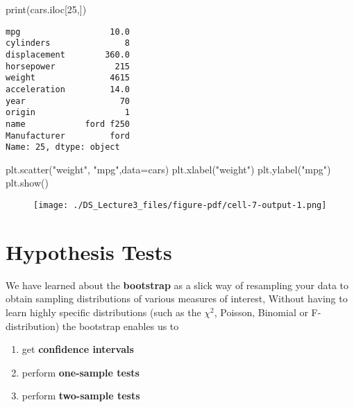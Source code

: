 \documentclass[
  letterpaper,
  DIV=11,
  numbers=noendperiod]{scrreprt}
\newenvironment{Shaded}{\begin{snugshade}}{\end{snugshade}}
\newcommand{\BuiltInTok}[1]{\textcolor[rgb]{0.00,0.23,0.31}{#1}}
\newcommand{\DecValTok}[1]{\textcolor[rgb]{0.68,0.00,0.00}{#1}}
\newcommand{\NormalTok}[1]{\textcolor[rgb]{0.00,0.23,0.31}{#1}}
\newcommand{\OperatorTok}[1]{\textcolor[rgb]{0.37,0.37,0.37}{#1}}
\newcommand{\StringTok}[1]{\textcolor[rgb]{0.13,0.47,0.30}{#1}}
\providecommand{\tightlist}{%
  \setlength{\itemsep}{0pt}\setlength{\parskip}{0pt}}\usepackage{longtable,booktabs,array}
\begin{document}
\begin{Shaded}
\begin{Highlighting}[]
\BuiltInTok{print}\NormalTok{(cars.iloc[}\DecValTok{25}\NormalTok{,])}
\end{Highlighting}
\end{Shaded}

\begin{verbatim}
mpg                  10.0
cylinders               8
displacement        360.0
horsepower            215
weight               4615
acceleration         14.0
year                   70
origin                  1
name            ford f250
Manufacturer         ford
Name: 25, dtype: object
\end{verbatim}

\begin{Shaded}
\begin{Highlighting}[]
\NormalTok{plt.scatter(}\StringTok{"weight"}\NormalTok{, }\StringTok{"mpg"}\NormalTok{,data}\OperatorTok{=}\NormalTok{cars)}
\NormalTok{plt.xlabel(}\StringTok{"weight"}\NormalTok{)}
\NormalTok{plt.ylabel(}\StringTok{"mpg"}\NormalTok{)}
\NormalTok{plt.show()}
\end{Highlighting}
\end{Shaded}

\begin{figure}[H]

{\centering \texttt{[image: ./DS\_Lecture3\_files/figure-pdf/cell-7-output-1.png]}

}

\end{figure}

\hypertarget{hypothesis-tests-1}{%
\section{Hypothesis Tests}\label{hypothesis-tests-1}}

We have learned about the \textbf{bootstrap} as a slick way of
resampling your data to obtain sampling distributions of various
measures of interest, Without having to learn highly specific
distributions (such as the \(\chi^2\), Poisson, Binomial or
F-distribution) the bootstrap enables us to

\begin{enumerate}
\def\labelenumi{\arabic{enumi}.}
\tightlist
\item
  get \textbf{confidence intervals}
\item
  perform \textbf{one-sample tests}
\item
  perform \textbf{two-sample tests}
\end{enumerate}
\end{document}
